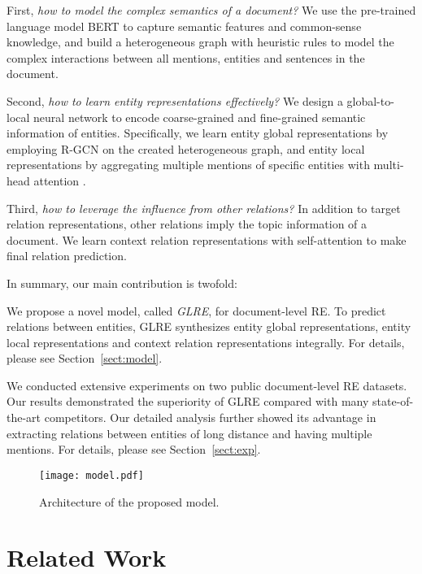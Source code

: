 \documentclass[11pt,a4paper]{article}
\begin{document}
First, \emph{how to model the complex semantics of a document?} We use the pre-trained language model BERT \cite{devlin2019bert} to capture semantic features and common-sense knowledge, and build a heterogeneous graph with heuristic rules to model the complex interactions between all mentions, entities and sentences in the document.

Second, \emph{how to learn entity representations effectively?} We design a global-to-local neural network to encode coarse-grained and fine-grained semantic information of entities. Specifically, we learn entity global representations by employing R-GCN \cite{schlichtkrull2018modeling} on the created heterogeneous graph, and entity local representations by aggregating multiple mentions of specific entities with multi-head attention \cite{vaswani2017attention}.

Third, \emph{how to leverage the influence from other relations?} In addition to target relation representations, other relations imply the topic information of a document. We learn context relation representations with self-attention \cite{sorokin2017context} to make final relation prediction.

In summary, our main contribution is twofold:
\begin{compactitem}
\item We propose a novel model, called \emph{GLRE}, for document-level RE. To predict relations between entities, GLRE synthesizes entity global representations, entity local representations and context relation representations integrally. For details, please see Section~\ref{sect:model}.
	
\item We conducted extensive experiments on two public document-level RE datasets. Our results demonstrated the superiority of GLRE compared with many state-of-the-art competitors. Our detailed analysis further showed its advantage in extracting relations between entities of long distance and having multiple mentions. For details, please see Section~\ref{sect:exp}.
\end{compactitem}



\begin{figure*}
	\centering
	\texttt{[image: model.pdf]}
	\caption{Architecture of the proposed model.}
	\label{fig:model}
\end{figure*}

\section{Related Work}
\label{sect:work}
\end{document}
